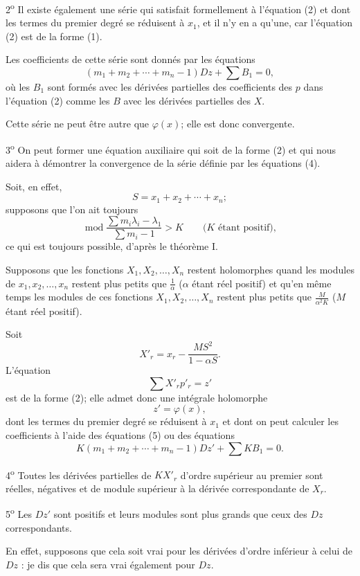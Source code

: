 \documentclass[11pt]{article}
\begin{document}
2\textsuperscript{o} Il existe également une série qui satisfait formellement à l’équation (2) et dont les termes du premier degré se réduisent à $x_1$, et il n’y en a qu’une, car l’équation (2) est de la forme (1).

Les coefficients de cette série sont donnés par les équations
\begin{equation*}\tag{5}
(m_1+m_2+\cdots+m_n-1)Dz+\sum B_1=0,
\end{equation*}
où les $B_1$ sont formés avec les dérivées partielles des coefficients des $p$ dans l’équation (2) comme les $B$ avec les dérivées partielles des $X$.

Cette série ne peut être autre que $\varphi(x)$; elle est donc convergente.

3\textsuperscript{o} On peut former une équation auxiliaire qui soit de la forme (2) et qui nous aidera à démontrer la convergence de la série définie par les équations (4).

Soit, en effet,
\[
S=x_1+x_2+\cdots+x_n;
\]
supposons que l’on ait toujours
\[
\operatorname{mod}\frac{\sum m_i\lambda_i-\lambda_1}{\sum m_i-1}>K
\qquad\text{($K$ étant positif)},
\]
ce qui est toujours possible, d’après le théorème I.

Supposons que les fonctions $X_1,X_2,\ldots,X_n$ restent holomorphes quand les modules de $x_1,x_2,\ldots,x_n$ restent plus petits que $\frac1\alpha$ ($\alpha$ étant réel positif) et qu’en même temps les modules de ces fonctions $X_1,X_2,\ldots,X_n$ restent plus petits que $\frac{M}{\alpha^2K}$ ($M$ étant réel positif).

Soit
\[
X'_r=x_r-\frac{MS^2}{1-\alpha S}.
\]
L’équation
\[
\sum X'_rp'_r=z'
\]
est de la forme (2); elle admet donc une intégrale holomorphe
\[
z'=\varphi(x),
\]
dont les termes du premier degré se réduisent à $x_1$ et dont on peut calculer les coefficients à l’aide des équations (5) ou des équations
\begin{equation*}\tag{5 bis}
K(m_1+m_2+\cdots+m_n-1)Dz'+\sum KB_1=0.
\end{equation*}

4\textsuperscript{o} Toutes les dérivées partielles de $KX'_r$ d’ordre supérieur au premier sont réelles, négatives et de module supérieur à la dérivée correspondante de $X_r$.

5\textsuperscript{o} Les $Dz'$ sont positifs et leurs modules sont plus grands que ceux des $Dz$ correspondants.

En effet, supposons que cela soit vrai pour les dérivées d’ordre inférieur à celui de $Dz$ : je dis que cela sera vrai également pour $Dz$.
\end{document}

